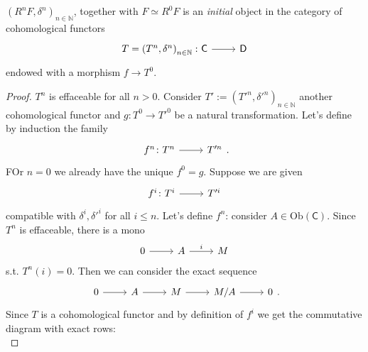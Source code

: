 \documentclass[../Main]{subfiles}
\begin{document}
\begin{rem}[]
	$\left(R^nF, \delta^n\right)_{n \in \mathbb{N}}$, together
	with $F \simeq R^0F$ is an {\em initial}
	object in the category of cohomological functors
	\begin{equation}
	\begin{tikzcd}
		T = \left(T^n, \delta^n\right)_{n \in \mathbb{N}}\colon \mathsf{C} 
		\arrow[r, "", rightarrow] &
		\mathsf{D}
	\end{tikzcd}
	\end{equation} 
	endowed with a morphism $f \to  T^0$.
\end{rem}
\begin{proof}
	$T^n$ is effaceable for all $n > 0$.
	Consider $T' := \left(T'^n, \delta'^n\right)_{n \in \mathbb{N}}$
	another cohomological functor
	and $g\colon T^0 \to T'^0$ be a natural transformation.
	Let's define by induction the family
	\begin{equation}
		\begin{tikzcd}
			f^n\colon T^n  \arrow[r, "", rightarrow] &
			T'^n
		\end{tikzcd}
	.\end{equation} 
	FOr $n = 0$ we already have the unique $f^0 = g$.
	Suppose we are given 
	\begin{equation}
		\begin{tikzcd}
			f^i\colon T^i  \arrow[r, "", rightarrow] &
			T'^i
		\end{tikzcd}
	\end{equation} 
	compatible with $\delta^i, \delta'^i$ for all $i \leq n$.
	Let's define $f^n$: consider $A \in \mathrm{Ob} \left(\mathsf{C}\right)$.
	Since $T^n$ is effaceable, there is a mono
	\begin{equation}
	\begin{tikzcd}
		0 \arrow[r, "", rightarrow] &
		A \arrow[r, "i", rightarrow] &
		M
	\end{tikzcd}
	\end{equation} 
	s.t. $T^n(i) = 0$.
	Then we can consider the exact sequence
	\begin{equation}
	\begin{tikzcd}
		0 \arrow[r, "", rightarrow] &
		A \arrow[r, "", rightarrow] &
		M \arrow[r, "", rightarrow] &
		M/A \arrow[r, "", rightarrow] &
		0
	\end{tikzcd}
	.\end{equation} 
	Since $T$ is a cohomological functor
	and by definition of $f^i$ we get the commutative diagram with exact rows:
	\begin{equation}

\end{equation}
\end{proof}
\end{document}
